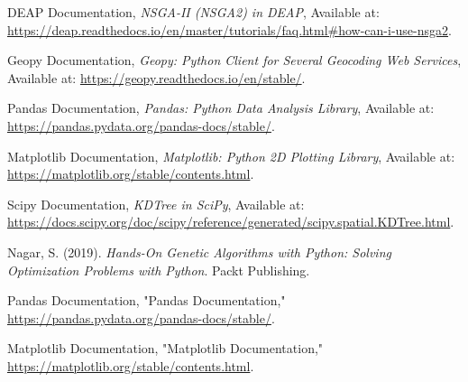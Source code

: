 \begin{thebibliography}{99}
    DEAP Documentation, \textit{NSGA-II (NSGA2) in DEAP}, Available at: \url{https://deap.readthedocs.io/en/master/tutorials/faq.html#how-can-i-use-nsga2}.
    
    
    
    Geopy Documentation, \textit{Geopy: Python Client for Several Geocoding Web Services}, Available at: \url{https://geopy.readthedocs.io/en/stable/}.
    
    Pandas Documentation, \textit{Pandas: Python Data Analysis Library}, Available at: \url{https://pandas.pydata.org/pandas-docs/stable/}.
    
    Matplotlib Documentation, \textit{Matplotlib: Python 2D Plotting Library}, Available at: \url{https://matplotlib.org/stable/contents.html}.
    
    Scipy Documentation, \textit{KDTree in SciPy}, Available at: \url{https://docs.scipy.org/doc/scipy/reference/generated/scipy.spatial.KDTree.html}.
    
    Nagar, S. (2019). \textit{Hands-On Genetic Algorithms with Python: Solving Optimization Problems with Python}. Packt Publishing.
    
     Pandas Documentation, "Pandas Documentation," \url{https://pandas.pydata.org/pandas-docs/stable/}.
    
    Matplotlib Documentation, "Matplotlib Documentation," \url{https://matplotlib.org/stable/contents.html}.
    
    
           
    
\end{thebibliography}
